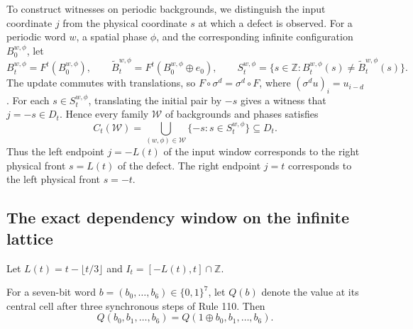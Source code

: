 To construct witnesses on periodic backgrounds, we distinguish the input coordinate $j$ from the physical coordinate $s$ at which a defect is observed. For a periodic word $w$, a spatial phase $\phi$, and the corresponding infinite configuration $B_0^{w,\phi}$, let
\begin{equation}\label{eq:diff_support}
B_t^{w,\phi} = F^t(B_0^{w,\phi}), \qquad
\widetilde B_t^{w,\phi} = F^t(B_0^{w,\phi} \oplus e_0), \qquad
S_t^{w,\phi} = \{ s \in \mathbb{Z} : B_t^{w,\phi}(s) \ne \widetilde B_t^{w,\phi}(s) \}.
\end{equation}
The update commutes with translations, so $F \circ \sigma^d = \sigma^d \circ F$, where $(\sigma^d u)_i = u_{i-d}$. For each $s \in S_t^{w,\phi}$, translating the initial pair by $-s$ gives a witness that $j = -s \in D_t$. Hence every family $\mathcal{W}$ of backgrounds and phases satisfies
\begin{equation}\label{eq:coverage_bridge}
C_t(\mathcal{W}) = \bigcup_{(w,\phi) \in \mathcal{W}} \{ -s : s \in S_t^{w,\phi} \} \subseteq D_t.
\end{equation}
Thus the left endpoint $j = -L(t)$ of the input window corresponds to the right physical front $s = L(t)$ of the defect. The right endpoint $j = t$ corresponds to the left physical front $s = -t$.

\subsection{The exact dependency window on the infinite lattice}

Let $L(t) = t - \lfloor t/3 \rfloor$ and $I_t = [-L(t), t] \cap \mathbb{Z}$.

\begin{lemma}\label{lem:three_step}
For a seven-bit word $b = (b_0, \dots, b_6) \in \{0, 1\}^7$, let $Q(b)$ denote the value at its central cell after three synchronous steps of Rule 110. Then
\begin{equation}\label{eq:seven_bit}
Q(b_0, b_1, \dots, b_6) = Q(1 \oplus b_0, b_1, \dots, b_6).
\end{equation}
\end{lemma}

